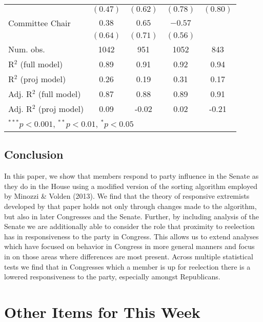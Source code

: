 \documentclass[12pt]{article}
\begin{document}
\begin{table}[H]
\begin{center}
\begin{tabular}{l c c c c }
			& $(0.47)$     & $(0.62)$      & $(0.78)$      & $(0.80)$     \\
			Committee Chair                   & $0.38$       & $0.65$        & $-0.57$       &              \\
			& $(0.64)$     & $(0.71)$      & $(0.56)$      &              \\
			\hline
			Num. obs.               & 1042         & 951           & 1052          & 843          \\
			R$^2$ (full model)      & 0.89         & 0.91          & 0.92          & 0.94         \\
			R$^2$ (proj model)      & 0.26         & 0.19          & 0.31          & 0.17         \\
			Adj. R$^2$ (full model) & 0.87         & 0.88          & 0.89          & 0.91         \\
			Adj. R$^2$ (proj model) & 0.09         & -0.02         & 0.02          & -0.21        \\
			\hline
			\multicolumn{5}{l}{\scriptsize{$^{***}p<0.001$, $^{**}p<0.01$, $^*p<0.05$}}
		\end{tabular}
	\end{center}
\end{table}

\subsection{Conclusion}

In this paper, we show that members respond to party influence in the Senate as they do in the House using a modified version of the sorting algorithm employed by Minozzi \& Volden (2013). We find that the theory of responsive extremists developed by that paper holds not only through changes made to the algorithm, but also in later Congresses and the Senate. Further, by including analysis of the Senate we are additionally able to consider the role that proximity to reelection has in responsiveness to the party in Congress. This allows us to extend analyses which have focused on behavior in Congress in more general manners and focus in on those areas where differences are most present. Across multiple statistical tests we find that in Congresses which a member is up for reelection there is a lowered responsiveness to the party, especially amongst Republicans.

\section{Other Items for This Week}
\end{document}
